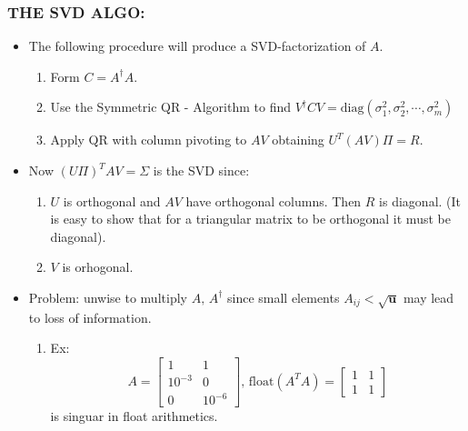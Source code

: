 \documentclass[a4paper,8pt]{beamer} %
\newcommand{\ts}[1]{\textbf{#1}}
\newcommand{\diag}[1]{\text{diag}{#1}}
\newcommand{\smatrix}[1]{\left[\begin{matrix} #1 \end{matrix}\right]}
\begin{document}
\begin{frame}%
\frametitle{THE SVD ALGO:}
\begin{itemize}
	\item <1-> The following procedure will produce a SVD-factorization of $A$. 
		\begin{enumerate}
			\item Form $C=A^\dagger A$.
			\item Use the Symmetric QR - Algorithm to find 
				$V^\dagger CV = \diag{(\sigma_{1}^2,\sigma_{2}^2,\cdots,\sigma_{m}^2)}$
			\item Apply QR with column pivoting to $AV$  obtaining $U^T(AV)\Pi=R$.
		\end{enumerate}
	\item <2-> Now  $(U\Pi)^T A V = \Sigma$ is the SVD since:
		\begin{enumerate}
			\item $U$ is orthogonal and $AV$ have orthogonal columns. Then $R$ is diagonal.  
				(It is easy to show that for a triangular matrix to be orthogonal it must be diagonal).
			\item $V$ is orhogonal.
		\end{enumerate}
	\item <3-> Problem: unwise to multiply $A,\,A^\dagger$ since small elements  
		$A_{ij}<\sqrt{\ts u}$ may lead to loss of information.
		\begin{enumerate}
			\item Ex:
				\begin{equation}
					A = \smatrix{1&1\\10^{-3}&0\\0&10^{-6}},\, \text{float}(A^TA) = \smatrix{1&1\\1&1}
				\end{equation}
		is singuar in float arithmetics.
		\end{enumerate}
\end{itemize}
\end{frame}%
\end{document}
